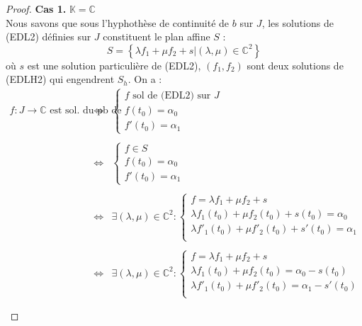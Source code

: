 \documentclass{article}
\begin{document}
\begin{proof} 
\textbf{Cas 1. } $\mathbb{K} = \mathbb{C}$ \\
Nous savons que sous l'hyphothèse de continuité de $b$ sur $J$, les solutions de (EDL2) définies sur $J$ constituent le plan affine $S$ :
$$S = \left\{ \lambda f_{1} + \mu f_{2} + s | (\lambda, \mu) \in \mathbb{C}^{2} \right\}$$
où $s$ est une solution particulière de (EDL2), $(f_{1}, f_{2})$ sont deux solutions de (EDLH2) qui engendrent $S_{h}$. On a : \\

$$\begin{array}{ccl}
    f : J \to \mathbb{C} \text{ est sol. du pb de Cauchy } 
    &\iff &\left\{ \begin{array}{l}
      f \text{ sol de (EDL2) sur } J    \\
      f(t_{0}) = \alpha_{0}    \\
      f'(t_{0}) = \alpha_{1}
    \end{array}  \right. \\\\
    &\iff &\left\{ \begin{array}{l}
      f \in S    \\
      f(t_{0}) = \alpha_{0}    \\
      f'(t_{0}) = \alpha_{1}
    \end{array}\right. \\\\
    &\iff &\exists (\lambda, \mu) \in \mathbb{C}^{2}: \left\{ \begin{array}{l}
      f = \lambda f_{1} + \mu f_{2} + s \\
      \lambda f_{1}(t_{0}) + \mu f_{2}(t_{0}) + s(t_{0}) = \alpha_{0} \\
      \lambda f'_{1}(t_{0}) + \mu f'_{2}(t_{0}) + s'(t_{0}) = \alpha_{1} \\
    \end{array} \right. \\\\
    &\iff &\exists (\lambda, \mu) \in \mathbb{C}^{2}: \left\{ \begin{array}{l}
      f = \lambda f_{1} + \mu f_{2} + s \\
      \lambda f_{1}(t_{0}) + \mu f_{2}(t_{0}) = \alpha_{0} - s(t_{0}) \\
      \lambda f'_{1}(t_{0}) + \mu f'_{2}(t_{0}) = \alpha_{1} - s'(t_{0}) \\
    \end{array} \right. \\\\

\end{array}$$
\end{proof}
\end{document}

